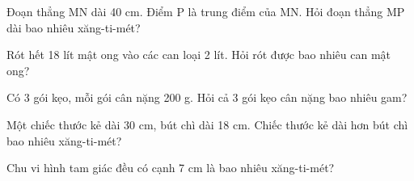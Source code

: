 \begin{ex}
Đoạn thẳng MN dài 40 cm. Điểm P là trung điểm của MN. Hỏi đoạn thẳng MP dài bao nhiêu xăng-ti-mét?
\end{ex}

\begin{ex}
Rót hết 18 lít mật ong vào các can loại 2 lít. Hỏi rót được bao nhiêu can mật ong?
\end{ex}

\begin{ex}
Có 3 gói kẹo, mỗi gói cân nặng 200 g. Hỏi cả 3 gói kẹo cân nặng bao nhiêu gam?
\end{ex}

\begin{ex}
Một chiếc thước kẻ dài 30 cm, bút chì dài 18 cm. Chiếc thước kẻ dài hơn bút chì bao nhiêu xăng-ti-mét?
\end{ex}

\begin{ex}
Chu vi hình tam giác đều có cạnh 7 cm là bao nhiêu xăng-ti-mét?
\end{ex}
